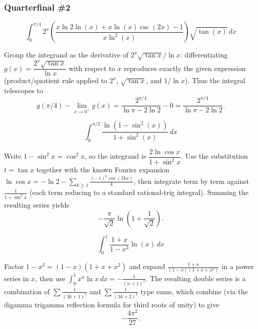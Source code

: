 \subsubsection*{Quarterfinal \#2}
\begin{questions}

\question
\[
\int_0^{\pi/4} 2^{x}\left(\frac{x\ln 2\ln(x)+x\ln(x)\csc(2x)-1}{x\ln^2(x)}\right)\sqrt{\tan(x)} \, dx
\]
\begin{solution}
Group the integrand as the derivative of $2^x\sqrt{\tan x}/\ln x$: differentiating $g(x)=\dfrac{2^x\sqrt{\tan x}}{\ln x}$ with respect to $x$ reproduces exactly the given expression (product/quotient rule applied to $2^x$, $\sqrt{\tan x}$, and $1/\ln x$). Thus the integral telescopes to
\[
g(\pi/4)-\lim_{x\to0^+}g(x) = \frac{2^{\pi/4}}{\ln\pi-2\ln2}-0 = \frac{2^{\pi/4}}{\ln\pi-2\ln2}.
\]
\end{solution}

\question
\[
\int_0^{\pi/2} \frac{\ln\left(1-\sin^2(x)\right)}{1+\sin^2(x)} \, dx
\]
\begin{solution}
Write $1-\sin^2x=\cos^2x$, so the integrand is $\dfrac{2\ln\cos x}{1+\sin^2x}$. Use the substitution $t=\tan x$ together with the known Fourier expansion $\ln\cos x=-\ln2-\sum_{k\ge1}\frac{(-1)^k\cos(2kx)}{k}$, then integrate term by term against $\frac{1}{1+\sin^2x}$ (each term reducing to a standard rational-trig integral). Summing the resulting series yields
\[
-\frac{\pi}{\sqrt2}\ln\!\left(1+\frac{1}{\sqrt2}\right).
\]
\end{solution}

\question
\[
\int_0^1 \frac{1+x}{1-x^3}\ln(x) \, dx
\]
\begin{solution}
Factor $1-x^3=(1-x)(1+x+x^2)$ and expand $\frac{1+x}{(1-x)(1+x+x^2)}$ in a power series in $x$, then use $\int_0^1 x^n\ln x\,dx=-\frac{1}{(n+1)^2}$. The resulting double series is a combination of $\sum \frac{1}{(3k+1)^2}$ and $\sum\frac{1}{(3k+2)^2}$ type sums, which combine (via the digamma trigamma reflection formula for third roots of unity) to give
\[
-\frac{4\pi^2}{27}.
\]
\end{solution}

\end{questions}

